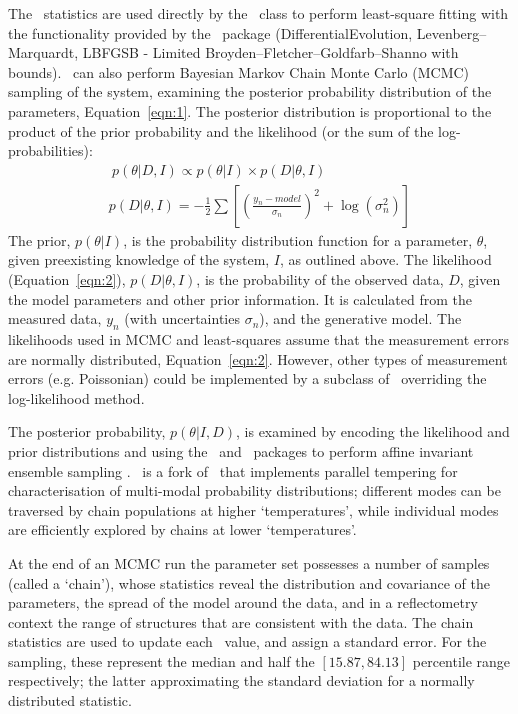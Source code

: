 \documentclass[pdf,preprint]{iucr}
\begin{document}
The \Objective\ statistics are used directly by the \CurveFitter\ class to perform least-square fitting with the functionality provided by the \SciPy\ package (DifferentialEvolution, Levenberg--Marquardt, LBFGSB - Limited Broyden--Fletcher--Goldfarb--Shanno with bounds).
\CurveFitter\ can also perform Bayesian Markov Chain Monte Carlo (MCMC) sampling of the system, examining the posterior probability distribution of the parameters, Equation~\ref{eqn:1}. The posterior distribution is proportional to the product of the prior probability and the likelihood (or the sum of the log-probabilities):
%
\begin{gather} 
\label{eqn:1}\ p(\theta | D, I) \propto p(\theta | I)\times p(D | \theta, I)\\
p(D | \theta, I) = -\frac{1}{2} \sum \left[\left(\frac{y_n - model} {\sigma_n}\right)^2 + \log(\sigma_n^2)\right]\label{eqn:2}
\end{gather}
%
The prior, $p(\theta | I)$, is the probability distribution function for a parameter, $\theta$, given preexisting knowledge of the system, $I$, as outlined above.
The likelihood (Equation~\ref{eqn:2}), $p(D | \theta, I)$, is the probability of the observed data, $D$, given the model parameters and other prior information. It is calculated from the measured data, $y_n$ (with uncertainties $\sigma_n$), and the generative model. The likelihoods used in MCMC and least-squares assume that the measurement errors are normally distributed, Equation~\ref{eqn:2}. However, other types of measurement errors (e.g. Poissonian) could be implemented by a subclass of \Objective\ overriding the log-likelihood method.

The posterior probability, $p(\theta | I, D)$, is examined by encoding the likelihood and prior distributions and using the \emcee\ and \ptemcee\ packages to perform affine invariant ensemble sampling \cite{emcee, ptemcee}. \ptemcee\ is a fork of \emcee\ that implements parallel tempering for characterisation of multi-modal probability distributions; different modes can be traversed by chain populations at higher `temperatures', while individual modes are efficiently explored by chains at lower `temperatures'. 

At the end of an MCMC run the parameter set possesses a number of samples (called a `chain'), whose statistics reveal the distribution and covariance of the parameters, the spread of the model around the data, and in a reflectometry context the range of structures that are consistent with the data.
The chain statistics are used to update each \Parameter\ value, and assign a standard error. For the sampling, these represent the median and half the $[15.87, 84.13]$ percentile range respectively; the latter approximating the standard deviation for a normally distributed statistic.
\end{document}
